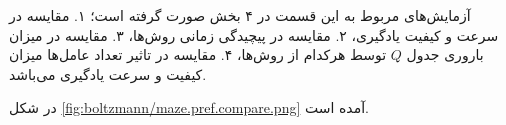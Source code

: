 آزمایش‌های مربوط به این قسمت در ۴ بخش صورت گرفته است؛ ۱. مقایسه در سرعت و کیفیت یادگیری، ۲. مقایسه در پیچیدگی زمانی روش‌ها، ۳. مقایسه در میزان باروری جدول $Q$ توسط هرکدام از روش‌ها، ۴. مقایسه در تاثیر تعداد عامل‌ها میزان کیفیت و سرعت یادگیری می‌باشد.

 در شکل
\ref{fig:boltzmann/maze.pref.compare.png}
آمده است.

